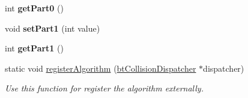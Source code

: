 \begin{DoxyCompactItemize}
int {\bfseries get\+Part0} ()
\item 
\mbox{\label{classbtGImpactCollisionAlgorithm_a8331035e2532a2380fb9852e130fa72e}} 
void {\bfseries set\+Part1} (int value)
\item 
\mbox{\label{classbtGImpactCollisionAlgorithm_aed04922dcbc9e78ab2af970628037684}} 
int {\bfseries get\+Part1} ()
\item 
\mbox{\label{classbtGImpactCollisionAlgorithm_a8ddef653ddc1afa7c976abb1ecaf0b98}} 
static void \hyperlink{classbtGImpactCollisionAlgorithm_a8ddef653ddc1afa7c976abb1ecaf0b98}{register\+Algorithm} (\hyperlink{classbtCollisionDispatcher}{bt\+Collision\+Dispatcher} $\ast$dispatcher)
\begin{DoxyCompactList}\small\item\em Use this function for register the algorithm externally. \end{DoxyCompactList}\end{DoxyCompactItemize}
